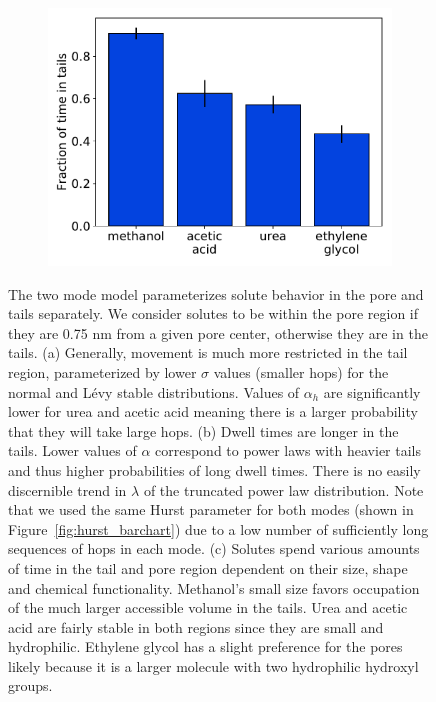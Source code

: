 \documentclass[aps,pre,preprint,groupedaddress]{revtex4-2}
\begin{document}
\begin{figure}
\begin{subfigure}{0.325\textwidth}
  \includegraphics[width=\textwidth]{AD_mode_occupation.pdf}
  \caption{}\label{fig:AD_mode_occupation}
  \end{subfigure}
  \caption{
  The two mode model parameterizes solute behavior in the pore and tails separately.
  We consider solutes to be within the pore region if they are 0.75 nm from a given pore
  center, otherwise they are in the tails. (a) Generally, movement is much more restricted
  in the tail region, parameterized by lower $\sigma$ values (smaller hops) for the 
normal and L\'evy stable 
distributions. Values of $\alpha_h$ are significantly lower for urea and acetic acid meaning 
  there is a larger probability that they will take large hops. (b) Dwell times are longer in 
  the tails. Lower values of $\alpha$ correspond to power laws with heavier tails and 
  thus higher probabilities of long dwell times. There is no easily discernible trend in
  $\lambda$ of the truncated power law distribution. Note that we used the same Hurst parameter
  for both modes (shown in Figure~\ref{fig:hurst_barchart}) due to a low number of 
  sufficiently long sequences of hops in each mode. (c) Solutes spend various amounts of 
  time in the tail and pore region dependent on their size, shape and chemical functionality.
  Methanol's small size favors occupation of the much larger accessible volume in the tails. 
  Urea and acetic acid are fairly stable in both regions since they are small and hydrophilic.
  Ethylene glycol has a slight preference for the pores likely because it is a larger molecule
  with two hydrophilic hydroxyl groups.
  }\label{fig:2mode_parameters}
  \end{figure} 
\end{document}
